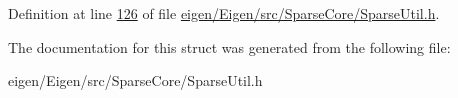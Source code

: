 Definition at line \hyperlink{eigen_2_eigen_2src_2_sparse_core_2_sparse_util_8h_source_l00126}{126} of file \hyperlink{eigen_2_eigen_2src_2_sparse_core_2_sparse_util_8h_source}{eigen/\+Eigen/src/\+Sparse\+Core/\+Sparse\+Util.\+h}.



The documentation for this struct was generated from the following file\+:\begin{DoxyCompactItemize}
\item 
eigen/\+Eigen/src/\+Sparse\+Core/\+Sparse\+Util.\+h\end{DoxyCompactItemize}
